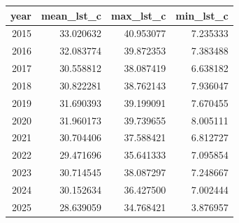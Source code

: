 \begin{tabular}{rrrr}
\toprule
year & mean\_lst\_c & max\_lst\_c & min\_lst\_c \\
\midrule
2015 & 33.020632 & 40.953077 & 7.235333 \\
2016 & 32.083774 & 39.872353 & 7.383488 \\
2017 & 30.558812 & 38.087419 & 6.638182 \\
2018 & 30.822281 & 38.762143 & 7.936047 \\
2019 & 31.690393 & 39.199091 & 7.670455 \\
2020 & 31.960173 & 39.739655 & 8.005111 \\
2021 & 30.704406 & 37.588421 & 6.812727 \\
2022 & 29.471696 & 35.641333 & 7.095854 \\
2023 & 30.714545 & 38.087297 & 7.248667 \\
2024 & 30.152634 & 36.427500 & 7.002444 \\
2025 & 28.639059 & 34.768421 & 3.876957 \\
\bottomrule
\end{tabular}
